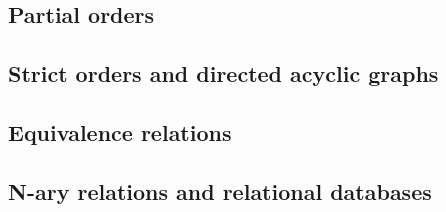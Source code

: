 \subsection{Partial orders}
\subsection{Strict orders and directed acyclic graphs}
\subsection{Equivalence relations}
\subsection{N-ary relations and relational databases}